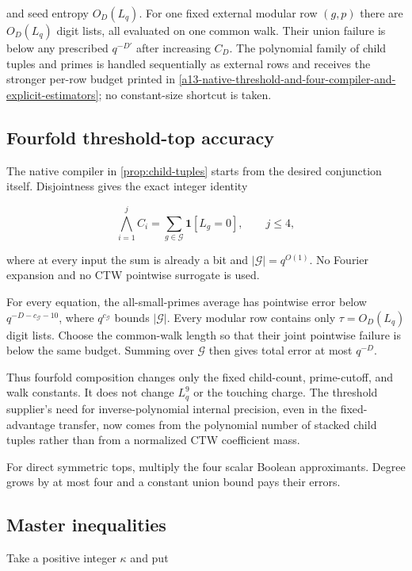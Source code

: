 \documentclass[11pt,letterpaper]{article}
\newcommand{\cref}[1]{\ref{#1}}
\theoremstyle{definition}
\theoremstyle{remark}
\begin{document}
and seed entropy \(O_D(L_q)\). For one fixed external modular row
\((g,p)\) there are \(O_D(L_q)\) digit lists, all evaluated on one
common walk. Their union failure is below any prescribed \(q^{-D'}\)
after increasing \(C_D\). The polynomial family of child tuples and
primes is handled sequentially as external rows and receives the
stronger per-row budget printed in \cref{a13-native-threshold-and-four-compiler-and-explicit-estimators}; no constant-size
shortcut is taken.

\subsection{Fourfold threshold-top
accuracy}\label{a6-fourfold-threshold-top-accuracy}

The native compiler in \cref{prop:child-tuples} starts from the desired
conjunction itself. Disjointness gives the exact integer identity

\[
\bigwedge_{i=1}^jC_i
{}={}
\sum_{g\in\mathcal G}
\mathbf1[L_g=0],
\qquad
j\le4,
\]

where at every input the sum is already a bit and
\(|\mathcal G|=q^{O(1)}\). No Fourier expansion and no CTW pointwise
surrogate is used.

For every equation, the all-small-primes average has pointwise error
below \(q^{-D-c_{\mathcal G}-10}\), where \(q^{c_{\mathcal G}}\) bounds
\(|\mathcal G|\). Every modular row contains only \(\tau=O_D(L_q)\)
digit lists. Choose the common-walk length so that their joint pointwise
failure is below the same budget. Summing over \(\mathcal G\) then gives
total error at most \(q^{-D}\).

Thus fourfold composition changes only the fixed child-count,
prime-cutoff, and walk constants. It does not change \(L_q^9\) or the
touching charge. The threshold supplier's need for
inverse-polynomial internal precision, even in the fixed-advantage
transfer, now comes from the polynomial number of stacked child tuples
rather than from a normalized CTW coefficient mass.

For direct symmetric tops, multiply the four scalar Boolean
approximants. Degree grows by at most four and a constant union bound
pays their errors.

\subsection{Master inequalities}\label{a7-master-inequalities}

Take a positive integer \(\kappa\) and put
\end{document}

